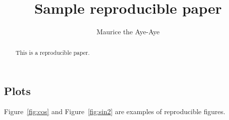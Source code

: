 \author{Maurice the Aye-Aye}
\title{Sample reproducible paper}
\begin{abstract}
  This is a reproducible paper. 
\end{abstract}

\subsection{Plots}
Figure~\ref{fig:cos} and Figure~\ref{fig:sin2} are
examples of reproducible figures.


